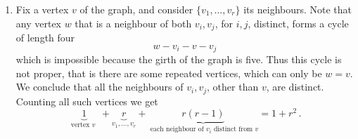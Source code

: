 \documentclass[kulak]{tplt}
\theoremstyle{definition}
\begin{document}
\begin{enumerate}
\item 
Fix a vertex $v$ of the graph, and consider $\{v_1, \dots, v_r\}$ its neighbours.
Note that any vertex $w$ that is a neighbour of both $v_i, v_j$, for $i, j$, distinct, forms a cycle of length four
$$ w - v_i - v - v_j $$
which is impossible because the girth of the graph is five.
Thus this cycle is not proper, that is there are some repeated vertices, which can only be $w = v$.
We conclude that all the neighbours of $v_i, v_j$, other than $v$, are distinct.
Counting all such vertices we get
$$ \underbrace{1}_{\text{ vertex $v$ }} + \underbrace{r}_{v_1, \ldots , v_r} + \underbrace{r(r-1)}_{\text{ each neighbour of $v_i$ distinct from $v$}} = 1 + r^2 \, .$$
\end{enumerate}
\end{document}
